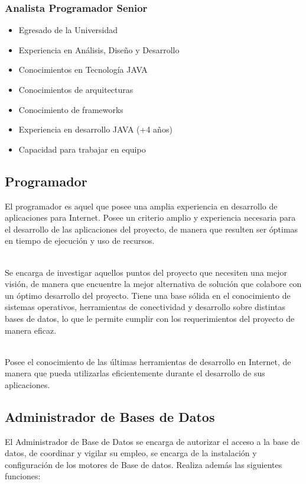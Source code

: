 		\subsubsection{Analista Programador Senior}
			\begin{itemize}
				\item Egresado de la Universidad
				\item Experiencia en Análisis, Diseño y Desarrollo
				\item Conocimientos en Tecnología JAVA
				\item Conocimientos de arquitecturas
				\item Conocimiento de frameworks
				\item Experiencia en desarrollo JAVA (+4 años)
				\item Capacidad para trabajar en equipo
			\end{itemize}		
	
	\subsection{Programador}
		El programador es aquel que posee una amplia experiencia en desarrollo de
		aplicaciones para Internet. Posee un criterio amplio y experiencia necesaria
		para el desarrollo de las aplicaciones del proyecto, de manera que resulten ser
		óptimas en tiempo de ejecución y uso de recursos.\\\
		
		Se encarga de investigar aquellos puntos del proyecto que necesiten una mejor
		visión, de manera que encuentre la mejor alternativa de solución que colabore
		con un óptimo desarrollo del proyecto. Tiene una base sólida en el
		conocimiento de sistemas operativos, herramientas de conectividad y
		desarrollo sobre distintas bases de datos, lo que le permite cumplir con los
		requerimientos del proyecto de manera eficaz.\\\
		
		Posee el conocimiento de las últimas herramientas de desarrollo en Internet,
		de manera que pueda utilizarlas eficientemente durante el desarrollo de sus
		aplicaciones.
		
	\subsection{Administrador de Bases de Datos}
		El Administrador de Base de Datos se encarga de autorizar el acceso a
		la base de datos, de coordinar y vigilar su empleo, se encarga de la
		instalación y configuración de los motores de Base de datos. Realiza además
		las siguientes funciones:
		
